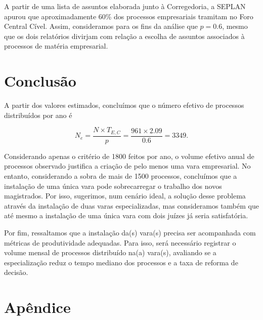 \documentclass[]{book}
\begin{document}
A partir de uma lista de assuntos elaborada junto à Corregedoria, a
SEPLAN apurou que aproximadamente 60\% dos processos empresariais
tramitam no Foro Central Cível. Assim, consideramos para os fins da
análise que \(p = 0.6\), mesmo que os dois relatórios divirjam com
relação a escolha de assuntos associados à processos de matéria
empresarial.

\chapter{Conclusão}\label{conclusao}

A partir dos valores estimados, concluímos que o número efetivo de
processos distribuídos por ano é

\[
N_e = \frac{N \times T_{E,C}}{p} = \frac{961 \times 2.09}{0.6} = 3349.
\]

Considerando apenas o critério de 1800 feitos por ano, o volume efetivo
anual de processos observado justifica a criação de pelo menos uma vara
empresarial. No entanto, considerando a sobra de mais de 1500 processos,
concluímos que a instalação de uma única vara pode sobrecarregar o
trabalho dos novos magistrados. Por isso, sugerimos, num cenário ideal,
a solução desse problema através da instalação de duas varas
especializadas, mas consideramos também que até mesmo a instalação de
uma única vara com dois juízes já seria satisfatória.

Por fim, ressaltamos que a instalação da(s) vara(s) precisa ser
acompanhada com métricas de produtividade adequadas. Para isso, será
necessário registrar o volume mensal de processos distribuído na(a)
vara(s), avaliando se a especialização reduz o tempo mediano dos
processos e a taxa de reforma de decisão.

\chapter{Apêndice}\label{apendice}
\end{document}
